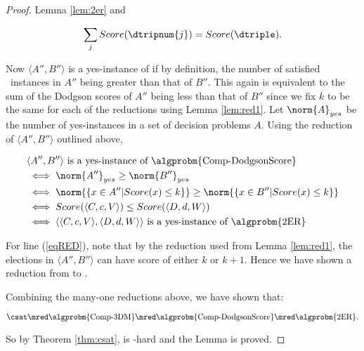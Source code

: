 \begin{proof}{Lemma \ref{lem:2er}}
    and

    \[\sum_j Score(\dtripnum{j}) =
    Score(\dtriple).\]

    Now $\langle A'', B'' \rangle$ is a yes-instance of
     if by definition,
    the number of satisfied \dscore~instances in $A''$ being greater than
    that of $B''$.
    This again is equivalent to the sum of the Dodgson
    scores of $A''$ being less than that of $B''$ since we fix
    $k$ to be the same for each of the reductions using Lemma \ref{lem:red1}.
    Let $\norm{A}_{yes}$ be the number of yes-instances in a set of decision
    problems $A$.
    Using the reduction of $\langle A'', B'' \rangle$ outlined above,

    \begin{align}
        &\langle A'', B'' \rangle \text{ is a yes-instance of
    \algprobm{Comp-DodgsonScore}}\nonumber\\
        &\iff \norm{A''}_{yes} \geq \norm{B''}_{yes} \nonumber \\
        &\iff \norm{\{x\in A'' | Score(x) \leq k\}} \geq
              \norm{\{x\in B'' | Score(x) \leq k\}} \nonumber\\
        &\iff Score(\langle C,c,V \rangle)\leq
        Score(\langle D,d,W \rangle) \label{eqRED} \\
        &\iff \langle \langle C,c,V \rangle, \langle D,d,W \rangle \rangle
        \text{ is a yes-instance of \algprobm{2ER}} \nonumber
    \end{align}

    For line (\ref{eqRED}), note that by the reduction used from
    Lemma \ref{lem:red1}, the elections in
    $\langle A'',B'' \rangle$ can have score of either $k$ or $k+1$.
    Hence we have shown a reduction from  to
    .

    Combining the many-one reductions above, we have shown that:

    \[\text{\csat} \mred \text{\algprobm{Comp-3DM}} \mred
    \text{\algprobm{Comp-DodgsonScore}} \mred
    \text{\algprobm{2ER}}.\]

    So by Theorem \ref{thm:csat},  is \tp-hard and the
    Lemma is proved.
\end{proof}

